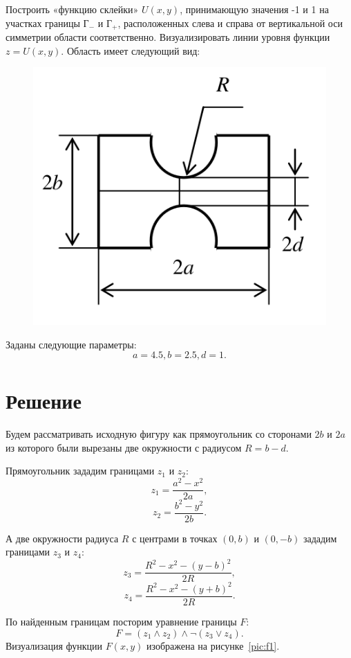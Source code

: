 \documentclass[12pt,a4paper,oneside]{extarticle}
\begin{document}
    Построить «функцию склейки» $U(x,y)$, принимающую значения -1 и 1 на участках границы Г$_-$ и Г$_+$, расположенных слева и справа от вертикальной оси симметрии области соответственно. Визуализировать линии уровня функции $z = U (x, y)$.
    Область имеет следующий вид:
    \begin{figure}[ht!]
        \centering
        \includegraphics[scale=0.5]{p1.png}
        \label{pic:p1}
    \end{figure}

    Заданы следующие параметры:
    $$a = 4.5, b=2.5,d=1.$$

\section{Решение}
    Будем рассматривать исходную фигуру как прямоугольник со сторонами $2b$ и $2a$ из которого были вырезаны две окружности с радиусом $R=b-d$.

    Прямоугольник зададим границами $z_1$ и $z_2$:
    $$z_1 = \dfrac{a^2-x^2}{2a},$$
    $$z_2 = \dfrac{b^2-y^2}{2b}.$$

    А две окружности радиуса $R$ с центрами в точках $(0,b)$ и $(0, -b)$ зададим границами $z_3$ и $z_4$:
    $$z_3 = \dfrac{R^2-x^2-(y-b)^2}{2R},$$
    $$z_4 = \dfrac{R^2-x^2-(y+b)^2}{2R}.$$

    По найденным границам посторим уравнение границы $F$:
    $$F = (z_1 \wedge z_2) \wedge \lnot (z_3 \vee z_4). $$
    Визуализация функции $F(x,y)$ изображена на рисунке~\ref{pic:f1}.
\end{document}
